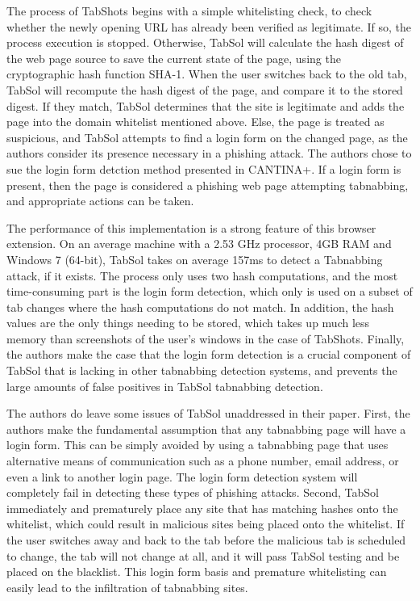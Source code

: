\documentclass[12pt]{article}
\begin{document}
\begin{doublespace}
The process of TabShots begins with a simple whitelisting check, to check whether the newly opening URL has already been verified as legitimate.  If so, the process execution is stopped.  Otherwise, TabSol will calculate the hash digest of the web page source to save the current state of the page, using the cryptographic hash function SHA-1.  When the user switches back to the old tab, TabSol will recompute the hash digest of the page, and compare it to the stored digest.  If they match, TabSol determines that the site is legitimate and adds the page into the domain whitelist mentioned above.  Else, the page is treated as suspicious, and TabSol attempts to find a login form on the changed page, as the authors consider its presence necessary in a phishing attack.  The authors chose to sue the login form detction method presented in CANTINA+.  If a login form is present, then the page is considered a phishing web page attempting tabnabbing, and appropriate actions can be taken.

The performance of this implementation is a strong feature of this browser extension.  On an average machine with a 2.53 GHz processor, 4GB RAM and Windows 7 (64-bit), TabSol takes on average 157ms to detect a Tabnabbing attack, if it exists.  The process only uses two hash computations, and the most time-consuming part is the login form detection, which only is used on a subset of tab changes where the hash computations do not match.  In addition, the hash values are the only things needing to be stored, which takes up much less memory than screenshots of the user's windows in the case of TabShots.  Finally, the authors make the case that the login form detection is a crucial component of TabSol that is lacking in other tabnabbing detection systems, and prevents the large amounts of false positives in TabSol tabnabbing detection.

The authors do leave some issues of TabSol unaddressed in their paper.  First, the authors make the fundamental assumption that any tabnabbing page will have a login form.  This can be simply avoided by using a tabnabbing page that uses alternative means of communication such as a phone number, email address, or even a link to another login page.  The login form detection system will completely fail in detecting these types of phishing attacks.  Second, TabSol immediately and prematurely place any site that has matching hashes onto the whitelist, which could result in malicious sites being placed onto the whitelist.  If the user switches away and back to the tab before the malicious tab is scheduled to change, the tab will not change at all, and it will pass TabSol testing and be placed on the blacklist.  This login form basis and premature whitelisting can easily lead to the infiltration of tabnabbing sites.


\end{doublespace}
\end{document}
